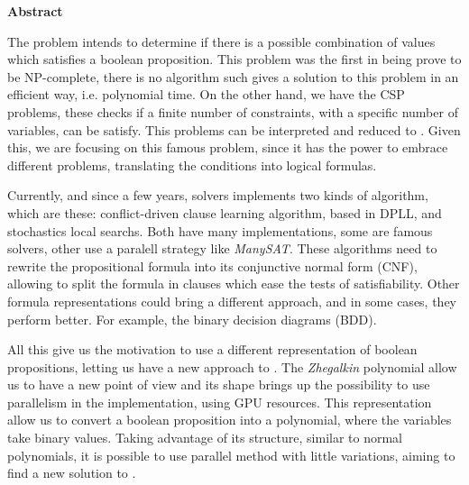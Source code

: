 \cleardoublepage
{}
{}
\thispagestyle{pagebottom}
\noindent\textbf{\Huge Abstract}

\vspace{2em}

The \sat problem intends to determine if there is a possible combination of values which satisfies a boolean proposition. This problem was the first in being prove to be NP-complete\cite{Cook}, there is no algorithm such gives a solution to this problem in an efficient way, i.e. polynomial time. On the other hand, we have the CSP problems, these checks if a finite number of constraints, with a specific number of variables, can be satisfy. This problems can be interpreted and reduced to \sat. Given this, we are focusing on this famous problem, since it has the power to embrace different problems, translating the conditions into logical formulas.

Currently, and since a few years, \sat solvers implements two kinds of algorithm, which are these: conflict-driven clause learning algorithm\cite{DBLP}, based in DPLL, and stochastics local searchs. Both have many implementations, some are famous \sat solvers, other use a paralell strategy like \textit{ManySAT}\cite{manysat}. These algorithms need to rewrite the propositional formula into its conjunctive normal form (CNF), allowing to split the formula in clauses which ease the tests of satisfiability. Other formula representations could bring a different approach, and in some cases, they perform better. For example, the binary decision diagrams (BDD).

All this give us the motivation to use a different representation of boolean propositions, letting us have a new approach to \sat. The \textit{Zhegalkin} polynomial\cite{zhegalkin} allow us to have a new point of view and its shape brings up the possibility to use parallelism in the implementation, using GPU resources. This representation allow us to convert a boolean proposition into a polynomial, where the variables take binary values. Taking advantage of its structure, similar to normal polynomials, it is possible to use parallel method with little variations, aiming to find a new solution to \sat.

\newpage